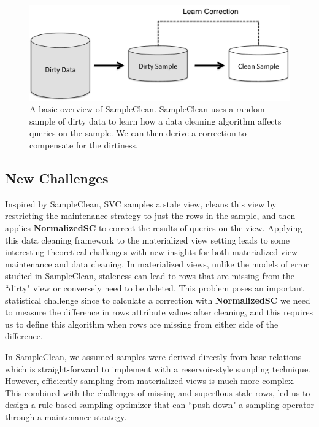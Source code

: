 \begin{figure}[t] \vspace{-2em}
\centering
 \includegraphics[scale=0.30]{figs/sys-arch2.pdf} \vspace{-.25em}
 \caption{A basic overview of SampleClean. SampleClean uses a random sample of dirty data to learn how a data cleaning algorithm affects queries on the sample. We can then derive a correction to compensate for the dirtiness.  \label{sc} }\vspace{-1.75em}
\end{figure}

\subsection{New Challenges}
Inspired by SampleClean, SVC samples a stale view, cleans this view by restricting the maintenance strategy to just the rows in the sample, and then applies \textbf{NormalizedSC} to correct the results of queries on the view.
Applying this data cleaning framework to the materialized view setting leads to some interesting theoretical challenges with new insights for both materialized view maintenance and data cleaning.
In materialized views, unlike the models of error studied in SampleClean, staleness can lead to rows that are missing from the ``dirty" view or conversely need to be deleted.
This problem poses an important statistical challenge since to calculate a correction with \textbf{NormalizedSC} we need to measure the difference in rows attribute values after cleaning, and this requires us to define this algorithm when rows are missing from either side of the difference.

In SampleClean, we assumed samples were derived directly from base relations which is straight-forward to implement with a reservoir-style sampling technique.
However, efficiently sampling from materialized views is much more complex.
This combined with the challenges of missing and superflous stale rows, led us to design a rule-based sampling optimizer that can ``push down" a sampling operator through a maintenance strategy.

